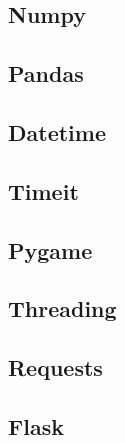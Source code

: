 \documentclass{cheatsheet}
\begin{document}
    \subsection{Numpy}
    \subsection{Pandas}
    \subsection{Datetime}
    \subsection{Timeit}
    \subsection{Pygame}
    \subsection{Threading}
    \subsection{Requests}
    \subsection{Flask}
    
\end{document}
